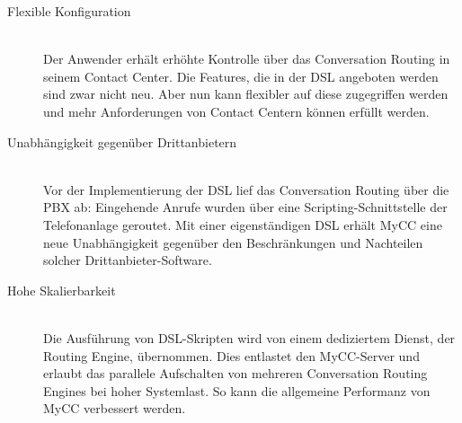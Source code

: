 \begin{description}
\item[Flexible Konfiguration] \hfill \\
Der Anwender erhält erhöhte Kontrolle über das Conversation Routing in seinem Contact Center. Die Features, die in der DSL angeboten werden sind zwar nicht neu. Aber nun kann flexibler auf diese zugegriffen werden und mehr Anforderungen von Contact Centern können erfüllt werden.
\item[Unabhängigkeit gegenüber Drittanbietern] \hfill \\
Vor der Implementierung der DSL lief das Conversation Routing über die PBX ab: Eingehende Anrufe wurden über eine Scripting-Schnittstelle der Telefonanlage geroutet. Mit einer eigenständigen DSL erhält MyCC eine neue Unabhängigkeit gegenüber den Beschränkungen und Nachteilen solcher Drittanbieter-Software.
\item[Hohe Skalierbarkeit] \hfill \\
Die Ausführung von DSL-Skripten wird von einem dediziertem Dienst, der Routing Engine, übernommen. Dies entlastet den MyCC-Server und erlaubt das parallele Aufschalten von mehreren Conversation Routing Engines bei hoher Systemlast. So kann die allgemeine Performanz von MyCC verbessert werden.
\end{description}

